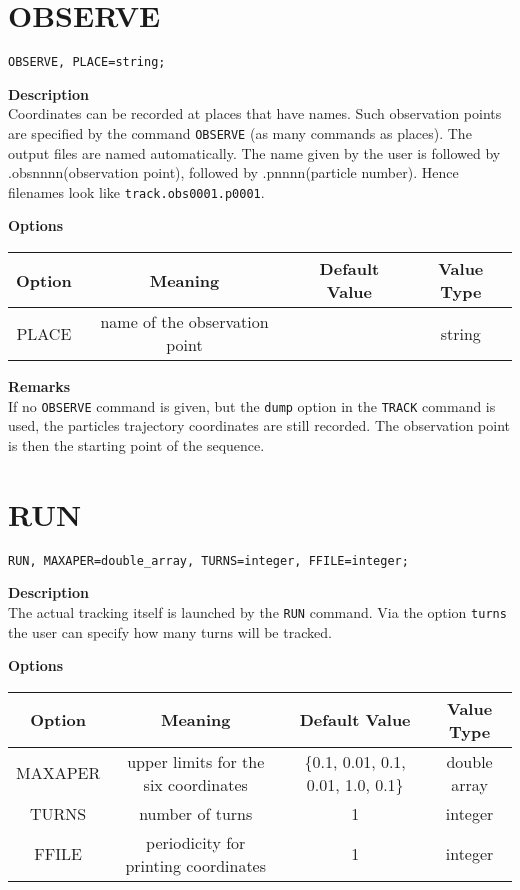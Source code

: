 \section{OBSERVE}
\begin{verbatim}
OBSERVE, PLACE=string;  
\end{verbatim}


{\bf Description} \\
Coordinates can be recorded at places that have names.  Such observation
points are specified by the command \texttt{OBSERVE} (as many commands
as places). The output files are named automatically. The name given by
the user is followed by .obsnnnn(observation point), followed by
.pnnnn(particle number). Hence filenames look like
\texttt{track.obs0001.p0001}.  
     
{\bf Options} 
\begin{tabular}{cccc}
   \hline 
   \textbf{Option} & \textbf{Meaning} & \textbf{Default Value} & \textbf{Value Type} \\ 
   \hline
   PLACE & name of the observation point &  & string \\ 
   \hline   
\end{tabular}

{\bf Remarks}\\ 
If no \texttt{OBSERVE} command is given, but the \texttt{dump} option in
the \texttt{TRACK} command is used, the particles trajectory coordinates
are still recorded. The observation point is then the starting point of
the sequence. 
     

\section{RUN}
\begin{verbatim}
RUN, MAXAPER=double_array, TURNS=integer, FFILE=integer;  
\end{verbatim}

  
{\bf Description}\\
The actual tracking itself is launched by the \texttt{RUN} command. Via
the option \texttt{turns} the user can specify how many turns will be
tracked. 
     
{\bf Options} 
     
\begin{tabular}{cccc}
   \hline 
   \textbf{Option} & \textbf{Meaning} & \textbf{Default Value} & \textbf{Value Type} \\ 
   \hline
   MAXAPER & upper limits for the six coordinates & \{0.1, 0.01, 0.1, 0.01, 1.0, 0.1\} & double array \\ 
   \hline
   TURNS & number of turns  & 1 & integer \\ 
   \hline
   FFILE & periodicity for printing coordinates  & 1 & integer \\ 
   \hline   
\end{tabular}

